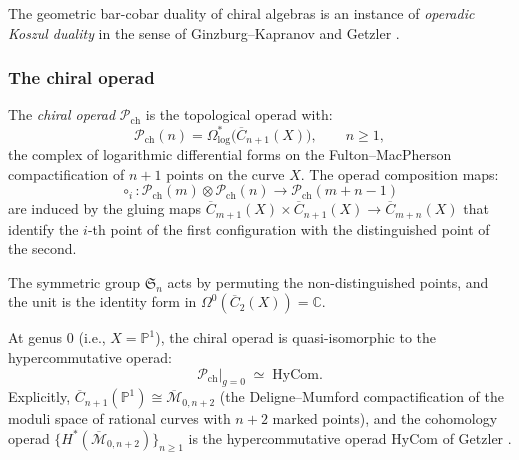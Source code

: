 The geometric bar-cobar duality of chiral algebras is an instance of
\emph{operadic Koszul duality} in the sense of Ginzburg--Kapranov
\cite{GK94} and Getzler \cite{Get95}.

\subsubsection{The chiral operad}

\begin{definition}\label{def:chiral-operad}
The \emph{chiral operad} $\mathcal{P}_{\mathrm{ch}}$ is the topological
operad with:
\[
\mathcal{P}_{\mathrm{ch}}(n)
= \Omega^*_{\log}\!\bigl(\overline{C}_{n+1}(X)\bigr),
\qquad n \geq 1,
\]
the complex of logarithmic differential forms on the Fulton--MacPherson
compactification of $n+1$ points on the curve $X$. The operad
composition maps:
\[
\circ_i \colon \mathcal{P}_{\mathrm{ch}}(m) \otimes
\mathcal{P}_{\mathrm{ch}}(n) \to \mathcal{P}_{\mathrm{ch}}(m+n-1)
\]
are induced by the gluing maps
$\overline{C}_{m+1}(X) \times \overline{C}_{n+1}(X) \to
\overline{C}_{m+n}(X)$ that identify the $i$-th point of the first
configuration with the distinguished point of the second.

The symmetric group $\mathfrak{S}_n$ acts by permuting the
non-distinguished points, and the unit is the identity form in
$\Omega^0(\overline{C}_2(X)) = \mathbb{C}$.
\end{definition}

\begin{proposition}%
\label{prop:chiral-operad-genus0}
At genus $0$ (i.e., $X = \mathbb{P}^1$), the chiral operad is
quasi-isomorphic to the hypercommutative operad:
\[
\mathcal{P}_{\mathrm{ch}}|_{g=0} \;\simeq\; \mathrm{HyCom}.
\]
Explicitly, $\overline{C}_{n+1}(\mathbb{P}^1) \cong
\overline{\mathcal{M}}_{0,n+2}$ (the Deligne--Mumford compactification
of the moduli space of rational curves with $n+2$ marked points), and
the cohomology operad
$\{H^*(\overline{\mathcal{M}}_{0,n+2})\}_{n \geq 1}$ is the
hypercommutative operad $\mathrm{HyCom}$ of Getzler \cite{Get95}.
\end{proposition}

